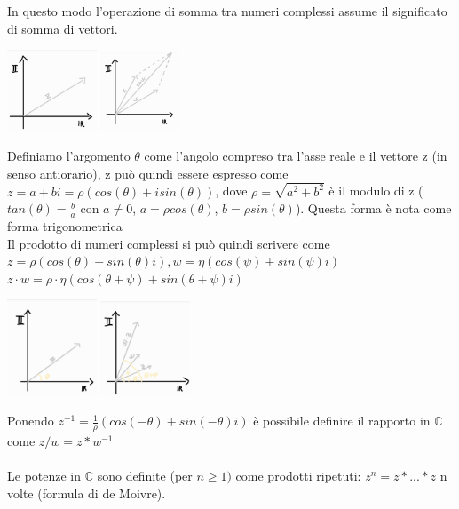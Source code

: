 \documentclass{article}
\begin{document}
In questo modo l'operazione di somma tra numeri complessi assume il significato di somma di vettori.
\begin{center}
    \includegraphics[width=0.2\textwidth]{im1}
    \includegraphics[width=0.175\textwidth]{im2}
\end{center}
Definiamo l'argomento $\theta$ come l'angolo compreso tra l'asse reale e il vettore z (in senso antiorario), z può quindi essere espresso come $z=a+bi=\rho(cos(\theta)+isin(\theta))$, dove $\rho=\sqrt{a^2+b^2}$ è il modulo di z ($tan(\theta)=\frac{b}{a}$ con $a\neq 0$, $a=\rho cos(\theta)$, $b=\rho sin(\theta)$). Questa forma è nota come forma trigonometrica\\
Il prodotto di numeri complessi si può quindi scrivere come $z=\rho(cos(\theta)+sin(\theta)i),w=\eta(cos(\psi)+sin(\psi)i)$ $z\cdot w=\rho\cdot\eta(cos(\theta+\psi)+sin(\theta+\psi)i)$
\begin{center}
\includegraphics[width=0.2\textwidth]{im3}
\includegraphics[width=0.2\textwidth]{im4}
\end{center}
Ponendo $z^{-1}=\frac{1}{\rho}(cos(-\theta)+sin(-\theta)i)$ è possibile definire il rapporto in $\mathds{C}$ come $z/w=z*w^{-1}$\\\\
Le potenze in $\mathds{C}$ sono definite (per $n\geq1)$ come prodotti ripetuti: $z^n=z*...*z$ n volte (formula di de Moivre).\\\\
\end{document}

